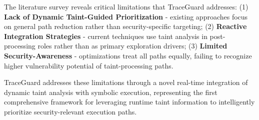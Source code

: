 The literature survey reveals critical limitations that TraceGuard addresses: (1) \textbf{Lack of Dynamic Taint-Guided Prioritization} - existing approaches focus on general path reduction rather than security-specific targeting; (2) \textbf{Reactive Integration Strategies} - current techniques use taint analysis in post-processing roles rather than as primary exploration drivers; (3) \textbf{Limited Security-Awareness} - optimizations treat all paths equally, failing to recognize higher vulnerability potential of taint-processing paths.

TraceGuard addresses these limitations through a novel real-time integration of dynamic taint analysis with symbolic execution, representing the first comprehensive framework for leveraging runtime taint information to intelligently prioritize security-relevant execution paths.
